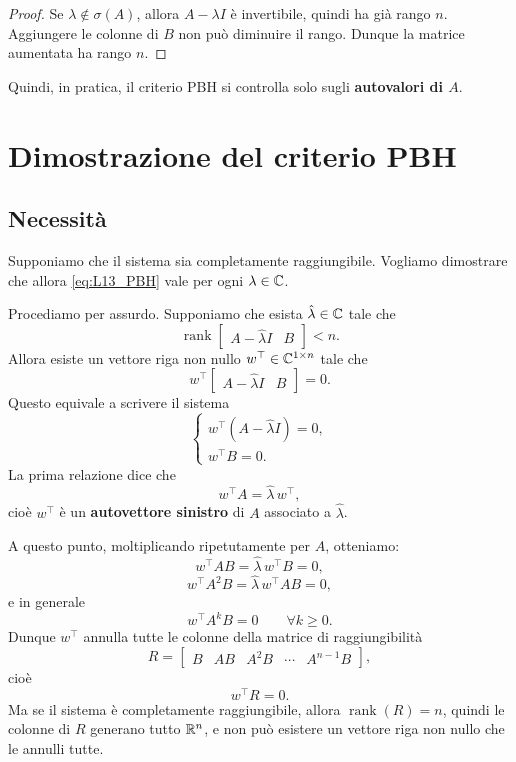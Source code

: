 \begin{proof}
Se \(\lambda\notin\sigma(A)\), allora \(A-\lambda I\) è invertibile, quindi ha già rango \(n\).  
Aggiungere le colonne di \(B\) non può diminuire il rango. Dunque la matrice aumentata ha rango \(n\).
\end{proof}

\begin{osservazione}
Quindi, in pratica, il criterio PBH si controlla solo sugli \textbf{autovalori di \(A\)}.
\end{osservazione}

\section{Dimostrazione del criterio PBH}

\subsection{Necessità}

Supponiamo che il sistema sia completamente raggiungibile.  
Vogliamo dimostrare che allora \eqref{eq:L13_PBH} vale per ogni \(\lambda\in\mathbb{C}\).

Procediamo per assurdo. Supponiamo che esista \(\hat\lambda\in\mathbb{C}\) tale che
\[
\operatorname{rank}
\begin{bmatrix}
A-\hat\lambda I & B
\end{bmatrix}
<n.
\]
Allora esiste un vettore riga non nullo \(w^\top\in\mathbb{C}^{1\times n}\) tale che
\begin{equation}
w^\top
\begin{bmatrix}
A-\hat\lambda I & B
\end{bmatrix}
=0.
\label{eq:L13_left_annihilator}
\end{equation}
Questo equivale a scrivere il sistema
\begin{equation}
\begin{cases}
w^\top(A-\hat\lambda I)=0,\\
w^\top B=0.
\end{cases}
\label{eq:L13_left_eig_system}
\end{equation}
La prima relazione dice che
\[
w^\top A=\hat\lambda\, w^\top,
\]
cioè \(w^\top\) è un \textbf{autovettore sinistro} di \(A\) associato a \(\hat\lambda\).

A questo punto, moltiplicando ripetutamente per \(A\), otteniamo:
\[
w^\top AB=\hat\lambda\, w^\top B=0,
\]
\[
w^\top A^2B=\hat\lambda\, w^\top AB=0,
\]
e in generale
\[
w^\top A^kB=0
\qquad \forall k\ge 0.
\]
Dunque \(w^\top\) annulla tutte le colonne della matrice di raggiungibilità
\[
R=\begin{bmatrix}
B & AB & A^2B & \cdots & A^{n-1}B
\end{bmatrix},
\]
cioè
\[
w^\top R=0.
\]
Ma se il sistema è completamente raggiungibile, allora \(\operatorname{rank}(R)=n\), quindi le colonne di \(R\) generano tutto \(\mathbb{R}^n\), e non può esistere un vettore riga non nullo che le annulli tutte.

